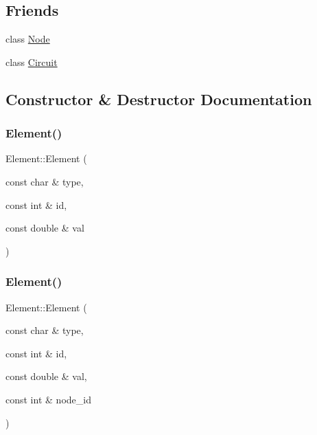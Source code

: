 \subsection*{Friends}
\begin{DoxyCompactItemize}
\item 
class \hyperlink{class_element_a6db9d28bd448a131448276ee03de1e6d}{Node}
\item 
class \hyperlink{class_element_a120b136c2c9bc1938e0cd2cca80d91e4}{Circuit}
\end{DoxyCompactItemize}


\subsection{Constructor \& Destructor Documentation}
\mbox{\label{class_element_a46b133f5dd7f66a6e77628e1c5909bb1}} 
\subsubsection{\texorpdfstring{Element()}{Element()}\hspace{0.1cm}{\footnotesize\ttfamily [1/2]}}
{\footnotesize\ttfamily Element\+::\+Element (\begin{DoxyParamCaption}\item[{const char \&}]{type,  }\item[{const int \&}]{id,  }\item[{const double \&}]{val }\end{DoxyParamCaption})}

\mbox{\label{class_element_a9c44833eb17cd7dcde61cf62441ddc6f}} 
\subsubsection{\texorpdfstring{Element()}{Element()}\hspace{0.1cm}{\footnotesize\ttfamily [2/2]}}
{\footnotesize\ttfamily Element\+::\+Element (\begin{DoxyParamCaption}\item[{const char \&}]{type,  }\item[{const int \&}]{id,  }\item[{const double \&}]{val,  }\item[{const int \&}]{node\+\_\+id }\end{DoxyParamCaption})}



